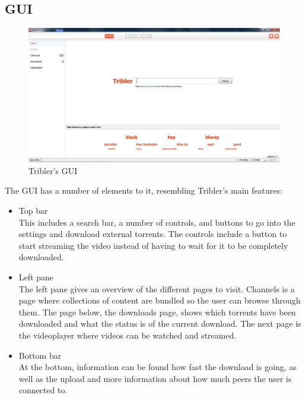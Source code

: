 \subsection{GUI}
\begin{figure}[h]
	\centering
	\includegraphics[scale=0.35]{tribler/images/tribler_gui.jpg}
	\caption{Tribler's GUI}
\end{figure}
The GUI has a number of elements to it, resembling Tribler's main features:
 \begin{itemize}
	\item Top bar\\ This includes a search bar, a number of controls, and buttons to go into the settings and download external torrents. The controls include a button to start streaming the video instead of having to wait for it to be completely downloaded.
	\item Left pane\\ The left pane gives an overview of the different pages to visit. Channels is a page where collections of content are bundled so the user can browse through them. The page below, the downloads page, shows which torrents have been downloaded and what the status is of the current download. The next page is the videoplayer where videos can be watched and streamed.
	\item Bottom bar\\ At the bottom, information can be found how fast the download is going, as well as the upload and more information about how much peers the user is connected to.
\end{itemize}

